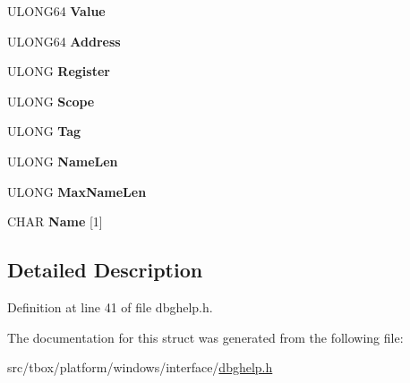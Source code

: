 \begin{DoxyCompactItemize}
\item 
\hypertarget{structtb__dbghelp__symbol__info__t_adf7a3d4a6b34957efefbabe6412b3023}{U\-L\-O\-N\-G64 {\bfseries Value}}\label{structtb__dbghelp__symbol__info__t_adf7a3d4a6b34957efefbabe6412b3023}

\item 
\hypertarget{structtb__dbghelp__symbol__info__t_a3e03216d4dce091f08f14cb702c50145}{U\-L\-O\-N\-G64 {\bfseries Address}}\label{structtb__dbghelp__symbol__info__t_a3e03216d4dce091f08f14cb702c50145}

\item 
\hypertarget{structtb__dbghelp__symbol__info__t_ae7b12e7c6341887432efc2c0b3326e52}{U\-L\-O\-N\-G {\bfseries Register}}\label{structtb__dbghelp__symbol__info__t_ae7b12e7c6341887432efc2c0b3326e52}

\item 
\hypertarget{structtb__dbghelp__symbol__info__t_ab5321740fad6ae89abc2cc74707d6497}{U\-L\-O\-N\-G {\bfseries Scope}}\label{structtb__dbghelp__symbol__info__t_ab5321740fad6ae89abc2cc74707d6497}

\item 
\hypertarget{structtb__dbghelp__symbol__info__t_a036d5c12d8f0ab1f0db1fc41e82fcea2}{U\-L\-O\-N\-G {\bfseries Tag}}\label{structtb__dbghelp__symbol__info__t_a036d5c12d8f0ab1f0db1fc41e82fcea2}

\item 
\hypertarget{structtb__dbghelp__symbol__info__t_aacd17946d0a8727a781340ebcb35e605}{U\-L\-O\-N\-G {\bfseries Name\-Len}}\label{structtb__dbghelp__symbol__info__t_aacd17946d0a8727a781340ebcb35e605}

\item 
\hypertarget{structtb__dbghelp__symbol__info__t_a878366ee1b8a430304cecf32d1ba3168}{U\-L\-O\-N\-G {\bfseries Max\-Name\-Len}}\label{structtb__dbghelp__symbol__info__t_a878366ee1b8a430304cecf32d1ba3168}

\item 
\hypertarget{structtb__dbghelp__symbol__info__t_a917bf499a3042fc5f34dc57b953d1ae9}{C\-H\-A\-R {\bfseries Name} \mbox{[}1\mbox{]}}\label{structtb__dbghelp__symbol__info__t_a917bf499a3042fc5f34dc57b953d1ae9}

\end{DoxyCompactItemize}


\subsection{Detailed Description}


Definition at line 41 of file dbghelp.\-h.



The documentation for this struct was generated from the following file\-:\begin{DoxyCompactItemize}
\item 
src/tbox/platform/windows/interface/\hyperlink{dbghelp_8h}{dbghelp.\-h}\end{DoxyCompactItemize}
